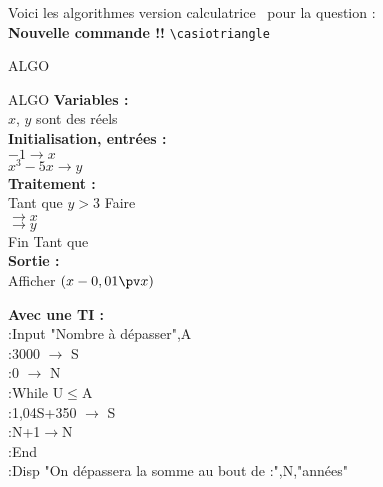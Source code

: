 \documentclass[12pt,french]{report}
\newcommand{\casiotriangle}[2]{\raisebox{#1em}{
\begin{tikzpicture}[scale=#2]
\tkzDefPoint(0,0){A}
\tkzDefPoint(1,0){B}
\tkzDefPoint(1,1){C}
\tkzDrawPolygon[fill=black](A,B,C)
\end{tikzpicture}
}
}
\begin{document}
\begin{spacing}{1.2}
\begin{center}
\end{center}

Voici les algorithmes version \og calculatrice\fg~ pour la question  :\\

\textbf{Nouvelle commande !!} \verb=\casiotriangle=\,

\begin{center}
\begin{mybox}[colback=blue!10]{ALGO}
\begin{small}\begin{center}
\begin{mybox}[colback=blue!10]{ALGO}
\textbf{Variables :} \\
      \hspace*{1cm} $x$, $y$  sont des réels\\
\textbf{Initialisation, entrées :} \\
      \hspace*{1cm} $-1\longrightarrow x$\\
      \hspace*{1cm} $x^3-5x\longrightarrow y$ \\
\textbf{Traitement :} \\
      \hspace*{1cm} Tant que $y>3$ Faire\\
      \hspace*{2cm}\makebox[0.2\textwidth]{\dotfill}$\longrightarrow x$ \\
      \hspace*{2cm}\makebox[0.2\textwidth]{\dotfill}$\longrightarrow y$ \\
      \hspace*{1cm} Fin Tant que \\
\textbf{Sortie :} \\
      \hspace*{1cm} Afficher $(x-0,01\pv x)$
\end{mybox}
\end{center}

\begin{multicols}{2}
\textbf{Avec une TI :}\\

:Input "Nombre à dépasser",A\\
:3000 $\rightarrow$ S\\
:0 $\rightarrow$ N\\
:While  U$\leq$A\\
:1,04S+350 $\rightarrow$ S\\
:N+1$\rightarrow$N\\
:End\\
:Disp "On dépassera la somme au bout de :",N,"années"


\end{multicols}
\end{small}
\end{mybox}
\end{center}
\end{spacing}
\end{document}
